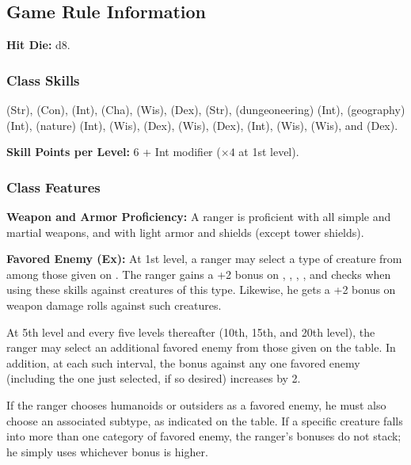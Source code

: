 \subsection{Game Rule Information}

\textbf{Hit Die:} d8.

\subsubsection{Class Skills}
 (Str),  (Con),  (Int),  (Cha),  (Wis),  (Dex),  (Str),  (dungeoneering) (Int),  (geography) (Int),  (nature) (Int),  (Wis),  (Dex),  (Wis),  (Dex),  (Int),  (Wis),  (Wis), and  (Dex).

\textbf{Skill Points per Level:} 6 + Int modifier ($\times 4$ at 1st level).

\subsubsection{Class Features}
\textbf{Weapon and Armor Proficiency:} A ranger is proficient with all simple and martial weapons, and with light armor and shields (except tower shields).

\textbf{Favored Enemy (Ex):} At 1st level, a ranger may select a type of creature from among those given on . The ranger gains a +2 bonus on , , , , and  checks when using these skills against creatures of this type. Likewise, he gets a +2 bonus on weapon damage rolls against such creatures.

At 5th level and every five levels thereafter (10th, 15th, and 20th level), the ranger may select an additional favored enemy from those given on the table. In addition, at each such interval, the bonus against any one favored enemy (including the one just selected, if so desired) increases by 2.

If the ranger chooses humanoids or outsiders as a favored enemy, he must also choose an associated subtype, as indicated on the table. If a specific creature falls into more than one category of favored enemy, the ranger's bonuses do not stack; he simply uses whichever bonus is higher.

